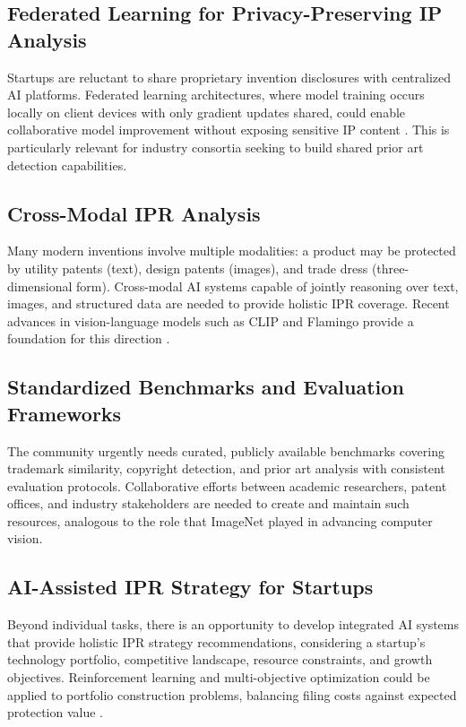\documentclass[conference]{IEEEtran}
\begin{document}
\subsection{Federated Learning for Privacy-Preserving IP Analysis}

Startups are reluctant to share proprietary invention disclosures with centralized AI platforms. Federated learning architectures, where model training occurs locally on client devices with only gradient updates shared, could enable collaborative model improvement without exposing sensitive IP content \cite{ref39}. This is particularly relevant for industry consortia seeking to build shared prior art detection capabilities.

\subsection{Cross-Modal IPR Analysis}

Many modern inventions involve multiple modalities: a product may be protected by utility patents (text), design patents (images), and trade dress (three-dimensional form). Cross-modal AI systems capable of jointly reasoning over text, images, and structured data are needed to provide holistic IPR coverage. Recent advances in vision-language models such as CLIP and Flamingo provide a foundation for this direction \cite{ref40}.

\subsection{Standardized Benchmarks and Evaluation Frameworks}

The community urgently needs curated, publicly available benchmarks covering trademark similarity, copyright detection, and prior art analysis with consistent evaluation protocols. Collaborative efforts between academic researchers, patent offices, and industry stakeholders are needed to create and maintain such resources, analogous to the role that ImageNet played in advancing computer vision.

\subsection{AI-Assisted IPR Strategy for Startups}

Beyond individual tasks, there is an opportunity to develop integrated AI systems that provide holistic IPR strategy recommendations, considering a startup's technology portfolio, competitive landscape, resource constraints, and growth objectives. Reinforcement learning and multi-objective optimization could be applied to portfolio construction problems, balancing filing costs against expected protection value \cite{ref34}.
\end{document}
